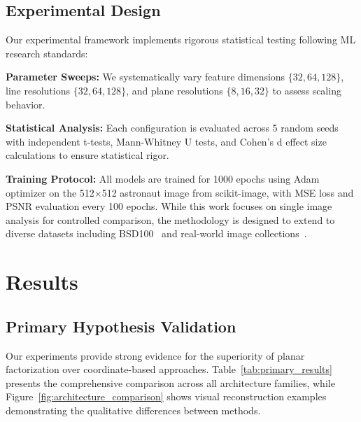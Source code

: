 \documentclass{article}
\begin{document}
\subsection{Experimental Design}

Our experimental framework implements rigorous statistical testing following ML research standards:

\textbf{Parameter Sweeps:} We systematically vary feature dimensions $\{32, 64, 128\}$, line resolutions $\{32, 64, 128\}$, and plane resolutions $\{8, 16, 32\}$ to assess scaling behavior.

\textbf{Statistical Analysis:} Each configuration is evaluated across 5 random seeds with independent t-tests, Mann-Whitney U tests, and Cohen's d effect size calculations to ensure statistical rigor.

\textbf{Training Protocol:} All models are trained for 1000 epochs using Adam optimizer on the 512×512 astronaut image from scikit-image, with MSE loss and PSNR evaluation every 100 epochs. While this work focuses on single image analysis for controlled comparison, the methodology is designed to extend to diverse datasets including BSD100~\cite{martin2001database} and real-world image collections~\cite{reizenstein2021common}.

\section{Results}

\subsection{Primary Hypothesis Validation}

Our experiments provide strong evidence for the superiority of planar factorization over coordinate-based approaches. Table~\ref{tab:primary_results} presents the comprehensive comparison across all architecture families, while Figure~\ref{fig:architecture_comparison} shows visual reconstruction examples demonstrating the qualitative differences between methods.
\end{document}
